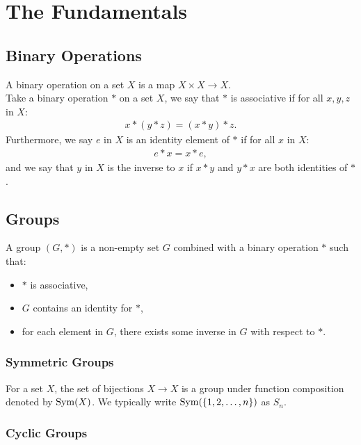 \section{The Fundamentals}

\subsection{Binary Operations}

A binary operation on a set $X$ is a map $X \times X \to X$.
\\[\baselineskip]
Take a binary operation $\ast$ on a set $X$, we say that $\ast$ is 
associative if for all $x, y, z$ in $X$: \begin{align*}
    x \ast (y \ast z) = (x \ast y) \ast z.
\end{align*} Furthermore, we say $e$ in $X$ is an identity element of $\ast$ if
for all $x$ in $X$: \begin{align*}
    e \ast x = x \ast e,
\end{align*} and we say that $y$ in $X$ is the inverse to $x$ if
$x \ast y$ and $y \ast x$ are both identities of $\ast$.

\subsection{Groups}

A group $(G, \ast)$ is a non-empty set $G$ combined with a binary operation
$\ast$ such that: \begin{itemize}
    \item $\ast$ is associative,
    \item $G$ contains an identity for $\ast$,
    \item for each element in $G$, there exists some inverse in $G$ 
        with respect to $\ast$.
\end{itemize}

\subsubsection{Symmetric Groups}

For a set $X$, the set of bijections $X \to X$ is a group under function
composition denoted by $\operatorname{Sym}(X)$. We typically write 
$\operatorname{Sym}(\{1, 2, \ldots, n\})$ as $S_n$.

\subsubsection{Cyclic Groups}

